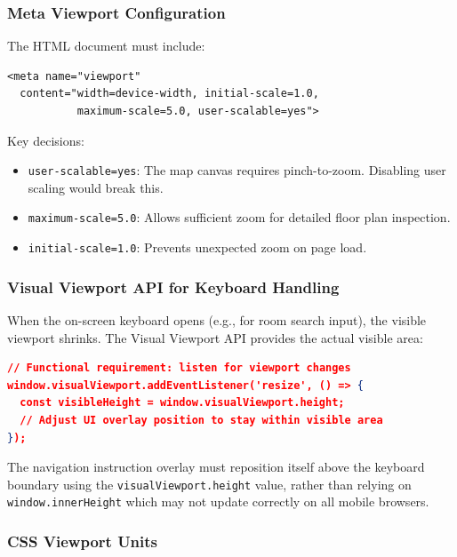\subsubsection{Meta Viewport Configuration}

The HTML document must include:
\begin{lstlisting}[basicstyle=\ttfamily\small, frame=single, breaklines=true]
<meta name="viewport"
  content="width=device-width, initial-scale=1.0,
           maximum-scale=5.0, user-scalable=yes">
\end{lstlisting}

Key decisions:
\begin{itemize}
  \item \texttt{user-scalable=yes}: The map canvas requires pinch-to-zoom. Disabling user scaling would break this.
  \item \texttt{maximum-scale=5.0}: Allows sufficient zoom for detailed floor plan inspection.
  \item \texttt{initial-scale=1.0}: Prevents unexpected zoom on page load.
\end{itemize}

\subsubsection{Visual Viewport API for Keyboard Handling}

When the on-screen keyboard opens (e.g., for room search input), the visible viewport shrinks. The Visual Viewport API \cite{W3CVisualViewport2023} provides the actual visible area:

\begin{lstlisting}[basicstyle=\ttfamily\small, frame=single, breaklines=true, language=json]
// Functional requirement: listen for viewport changes
window.visualViewport.addEventListener('resize', () => {
  const visibleHeight = window.visualViewport.height;
  // Adjust UI overlay position to stay within visible area
});
\end{lstlisting}

The navigation instruction overlay must reposition itself above the keyboard boundary using the \texttt{visualViewport.height} value, rather than relying on \texttt{window.innerHeight} which may not update correctly on all mobile browsers.

\subsubsection{CSS Viewport Units}

